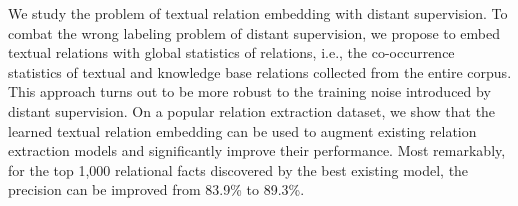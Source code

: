 We study the problem of textual relation embedding with distant supervision. To combat the wrong labeling problem of distant supervision, we propose to embed textual relations with global statistics of relations, i.e., the co-occurrence statistics of textual and knowledge base relations collected from the entire corpus. This approach turns out to be more robust to the training noise introduced by distant supervision. On a popular relation extraction dataset, we show that the learned textual relation embedding can be used to augment existing relation extraction models and significantly improve their performance. Most remarkably, for the top 1,000 relational facts discovered by the best existing model, the precision can be improved from 83.9\% to 89.3\%.
